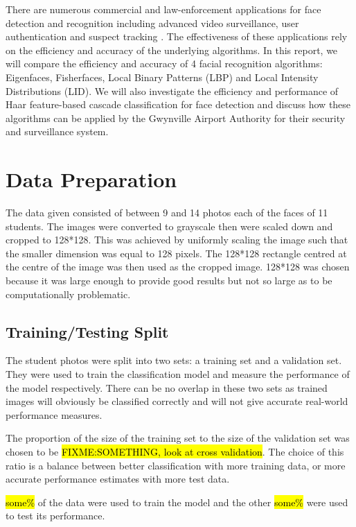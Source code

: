 \documentclass{article}
\begin{document}
There are numerous commercial and law-enforcement applications for face detection and recognition including advanced video surveillance, user authentication and suspect tracking \cite{zhao2003face}. The effectiveness of these applications rely on the efficiency and accuracy of the underlying algorithms. In this report, we will compare the efficiency and accuracy of 4 facial recognition algorithms: Eigenfaces, Fisherfaces, Local Binary Patterns (LBP) and Local Intensity Distributions (LID). We will also investigate the efficiency and performance of Haar feature-based cascade classification for face detection and discuss how these algorithms can be applied by the Gwynville Airport Authority for their security and surveillance system.

\section{Data Preparation}
The data given consisted of between 9 and 14 photos each of the faces of 11 students. The images were converted to grayscale then were scaled down and cropped to 128*128. This was achieved by uniformly scaling the image such that the smaller dimension was equal to 128 pixels. The 128*128 rectangle centred at the centre of the image was then used as the cropped image. 128*128 was chosen because it was large enough to provide good results but not so large as to be computationally problematic.


\subsection{Training/Testing Split}
The student photos were split into two sets: a training set and a validation set. They were used to train the classification model and measure the performance of the model respectively. There can be no overlap in these two sets as trained images will obviously be classified correctly and will not give accurate real-world performance measures.

The proportion of the size of the training set to the size of the validation set was chosen to be \hl{FIXME:SOMETHING, look at cross validation}. The choice of this ratio is a balance between better classification with more training data, or more accurate performance estimates with more test data.

\hl{some\%} of the data were used to train the model and the other \hl{some\%} were used to test its performance.


\end{document}
